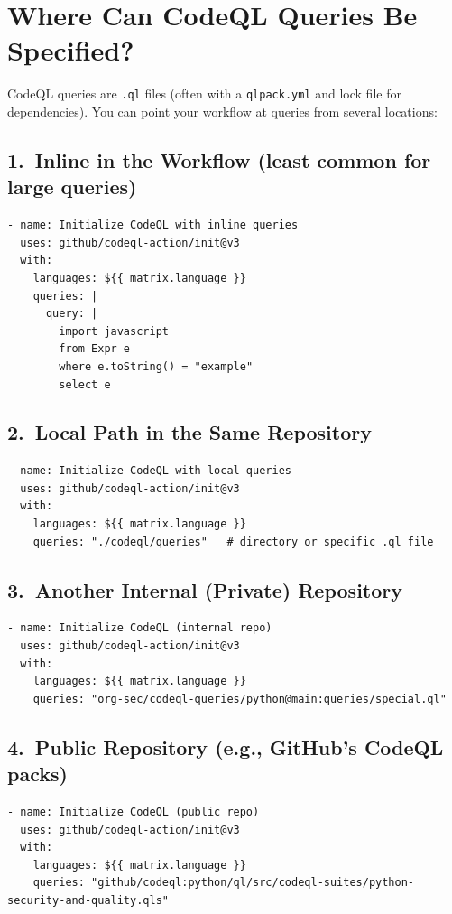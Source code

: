 \documentclass[11pt,a4paper]{article}
\begin{document}
\section{Where Can CodeQL Queries Be Specified?}
CodeQL queries are \texttt{.ql} files (often with a \texttt{qlpack.yml} and lock file for dependencies). You can point your workflow at queries from several locations:

\subsection*{1.\ Inline in the Workflow (least common for large queries)}
\begin{verbatim}
- name: Initialize CodeQL with inline queries
  uses: github/codeql-action/init@v3
  with:
    languages: ${{ matrix.language }}
    queries: |
      query: |
        import javascript
        from Expr e
        where e.toString() = "example"
        select e
\end{verbatim}

\subsection*{2.\ Local Path in the Same Repository}
\begin{verbatim}
- name: Initialize CodeQL with local queries
  uses: github/codeql-action/init@v3
  with:
    languages: ${{ matrix.language }}
    queries: "./codeql/queries"   # directory or specific .ql file
\end{verbatim}

\subsection*{3.\ Another Internal (Private) Repository}
\begin{verbatim}
- name: Initialize CodeQL (internal repo)
  uses: github/codeql-action/init@v3
  with:
    languages: ${{ matrix.language }}
    queries: "org-sec/codeql-queries/python@main:queries/special.ql"
\end{verbatim}

\subsection*{4.\ Public Repository (e.g., GitHub's CodeQL packs)}
\begin{verbatim}
- name: Initialize CodeQL (public repo)
  uses: github/codeql-action/init@v3
  with:
    languages: ${{ matrix.language }}
    queries: "github/codeql:python/ql/src/codeql-suites/python-security-and-quality.qls"
\end{verbatim}
\end{document}
